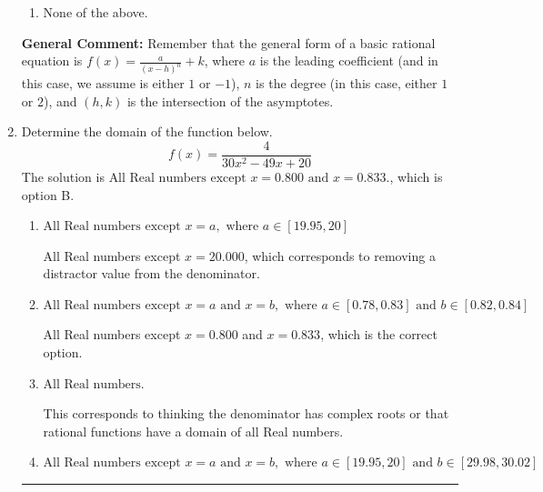 \documentclass{extbook}[14pt]
\newcommand{\litem}[1]{\item #1

\rule{\textwidth}{0.4pt}}
\begin{document}
\begin{enumerate}
{\begin{enumerate}[label=\Alph*.]
\item None of the above.\end{enumerate}
\textbf{General Comment:} Remember that the general form of a basic rational equation is $ f(x) = \frac{a}{(x-h)^n} + k$, where $a$ is the leading coefficient (and in this case, we assume is either $1$ or $-1$), $n$ is the degree (in this case, either $1$ or $2$), and $(h, k)$ is the intersection of the asymptotes.
}
\litem{
Determine the domain of the function below.
\[ f(x) = \frac{4}{30x^{2} -49 x + 20} \]The solution is \( \text{All Real numbers except } x = 0.800 \text{ and } x = 0.833. \), which is option B.\begin{enumerate}[label=\Alph*.]
\item \( \text{All Real numbers except } x = a, \text{ where } a \in [19.95, 20] \)

All Real numbers except $x = 20.000$, which corresponds to removing a distractor value from the denominator.
\item \( \text{All Real numbers except } x = a \text{ and } x = b, \text{ where } a \in [0.78, 0.83] \text{ and } b \in [0.82, 0.84] \)

All Real numbers except $x = 0.800$ and $x = 0.833$, which is the correct option.
\item \( \text{All Real numbers.} \)

This corresponds to thinking the denominator has complex roots or that rational functions have a domain of all Real numbers.
\item \( \text{All Real numbers except } x = a \text{ and } x = b, \text{ where } a \in [19.95, 20] \text{ and } b \in [29.98, 30.02] \)


\end{enumerate}}
\end{enumerate}
\end{document}
